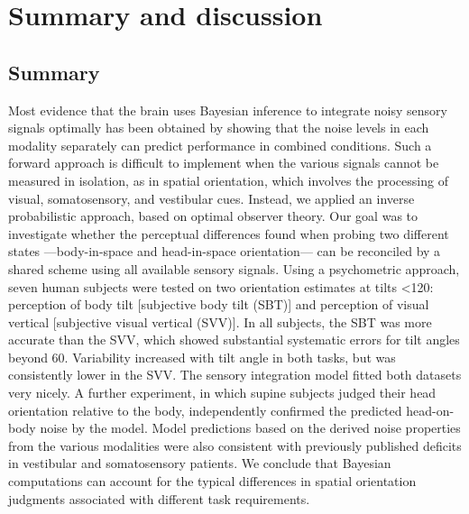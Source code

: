 \chapter{Summary and discussion}


\section{Summary}


Most evidence that the brain uses Bayesian inference to integrate noisy sensory signals optimally has been obtained by showing that the noise levels in each modality separately can predict performance in combined conditions. Such a forward approach is difficult to implement when the various signals cannot be measured in isolation, as in spatial orientation, which involves the processing of visual, somatosensory, and vestibular cues. Instead, we applied an inverse probabilistic approach, based on optimal observer theory. Our goal was to investigate whether the perceptual differences found when probing two different states ---body-in-space and head-in-space orientation--- can be reconciled by a shared scheme using all available sensory signals. Using a psychometric approach, seven human subjects were tested on two orientation estimates at tilts \textless 120\textdegree: perception of body tilt [subjective body tilt (SBT)] and perception of visual vertical [subjective visual vertical (SVV)]. In all subjects, the SBT was more accurate than the SVV, which showed substantial systematic errors for tilt angles beyond 60\textdegree. Variability increased with tilt angle in both tasks, but was consistently lower in the SVV. The sensory integration model fitted both datasets very nicely. A further experiment, in which supine subjects judged their head orientation relative to the body, independently confirmed the predicted head-on-body noise by the model. Model predictions based on the derived noise properties from the various modalities were also consistent with previously published deficits in vestibular and somatosensory patients. We conclude that Bayesian computations can account for the typical differences in spatial orientation judgments associated with different task requirements.

